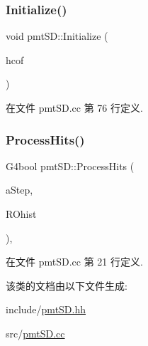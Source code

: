 \subsubsection{\texorpdfstring{Initialize()}{Initialize()}}
{\footnotesize\ttfamily void pmt\+S\+D\+::\+Initialize (\begin{DoxyParamCaption}\item[{G4\+H\+Cof\+This\+Event $\ast$}]{hcof }\end{DoxyParamCaption})\hspace{0.3cm}{\ttfamily [override]}}



在文件 pmt\+S\+D.\+cc 第 76 行定义.

\mbox{\label{classpmtSD_a5d557bd42f85305418f6ddd7e4bcfe7a}} 
\subsubsection{\texorpdfstring{Process\+Hits()}{ProcessHits()}}
{\footnotesize\ttfamily G4bool pmt\+S\+D\+::\+Process\+Hits (\begin{DoxyParamCaption}\item[{G4\+Step $\ast$}]{a\+Step,  }\item[{G4\+Touchable\+History $\ast$}]{R\+Ohist }\end{DoxyParamCaption})\hspace{0.3cm}{\ttfamily [override]}, {\ttfamily [protected]}}



在文件 pmt\+S\+D.\+cc 第 21 行定义.



该类的文档由以下文件生成\+:\begin{DoxyCompactItemize}
\item 
include/\hyperlink{pmtSD_8hh}{pmt\+S\+D.\+hh}\item 
src/\hyperlink{pmtSD_8cc}{pmt\+S\+D.\+cc}\end{DoxyCompactItemize}
